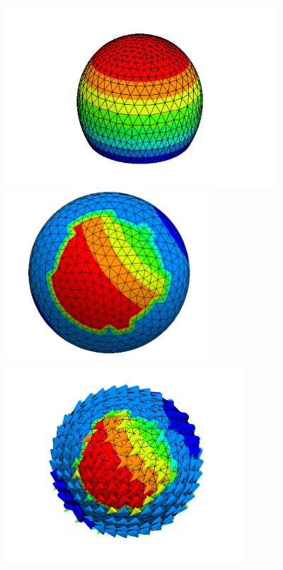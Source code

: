 \documentclass[11pt]{amsart}
\numberwithin{figure}{section}
\theoremstyle{plain}
\theoremstyle{definition}
\numberwithin{equation}{section}
\begin{document}
\begin{figure}
\includegraphics[width=4in]{./figures/deform.png}
\includegraphics[width=3in]{./figures/surfa.png}
\includegraphics[width=3.5in]{./figures/surfv.png}
\end{figure}



\end{document}
